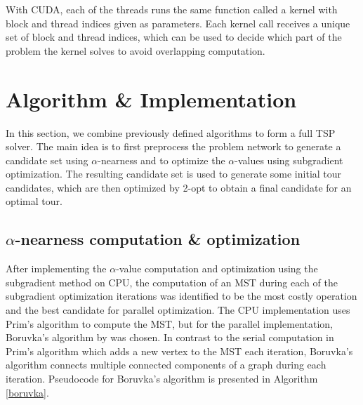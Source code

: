 \documentclass[english, 12pt, a4paper, sci, utf8, a-1b, online]{aaltothesis}
\begin{document}
With CUDA, each of the threads runs the same function called a kernel with block and thread indices given as parameters. Each kernel call receives a unique set of block and thread indices, which can be used to decide which part of the problem the kernel solves to avoid overlapping computation.

\section{Algorithm \& Implementation} \label{section:algo}
In this section, we combine previously defined algorithms to form a full TSP solver. The main idea is to first preprocess the problem network to generate a candidate set using $\alpha$-nearness and to optimize the $\alpha$-values using subgradient optimization. The resulting candidate set is used to generate some initial tour candidates, which are then optimized by 2-opt to obtain a final candidate for an optimal tour.


\subsection{$\alpha$-nearness computation \& optimization} \label{section:alpopt}
After implementing the $\alpha$-value computation and optimization using the subgradient method on CPU, the computation of an MST during each of the subgradient optimization iterations was identified to be the most costly operation and the best candidate for parallel optimization. The CPU implementation uses Prim's algorithm to compute the MST, but for the parallel implementation, Boruvka's algorithm by \cite{401280} was chosen. In contrast to the serial computation in Prim's algorithm which adds a new vertex to the MST each iteration, Boruvka's algorithm connects multiple connected components of a graph during each iteration. Pseudocode for Boruvka's algorithm is presented in Algorithm \ref{boruvka}.
\end{document}
